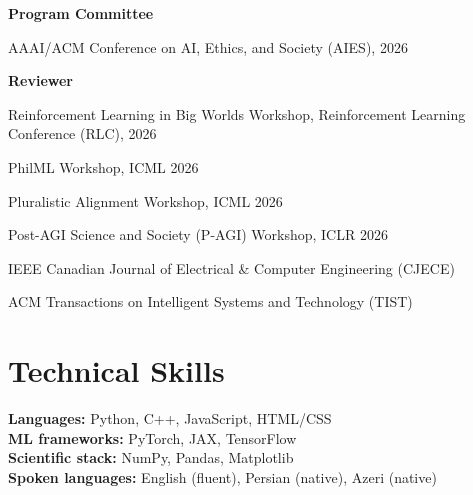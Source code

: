 \documentclass[letterpaper,11pt]{article}
\newcommand{\role}[2]{\textbf{#1}\hfill{#2}\par}
\begin{document}
\role{Program Committee}{}
\begin{tight}
  \item AAAI/ACM Conference on AI, Ethics, and Society (AIES), 2026
\end{tight}
\vspace{0.4em}
\role{Reviewer}{}
\begin{tight}
  \item Reinforcement Learning in Big Worlds Workshop, Reinforcement Learning Conference (RLC), 2026
  \item PhilML Workshop, ICML 2026
  \item Pluralistic Alignment Workshop, ICML 2026
  \item Post-AGI Science and Society (P-AGI) Workshop, ICLR 2026
  \item IEEE Canadian Journal of Electrical \& Computer Engineering (CJECE)
  \item ACM Transactions on Intelligent Systems and Technology (TIST)
\end{tight}

\section{Technical Skills}

\textbf{Languages:} Python, C++, JavaScript, HTML/CSS\\
\textbf{ML frameworks:} PyTorch, JAX, TensorFlow\\
\textbf{Scientific stack:} NumPy, Pandas, Matplotlib\\
\textbf{Spoken languages:} English (fluent), Persian (native), Azeri (native)
\end{document}
